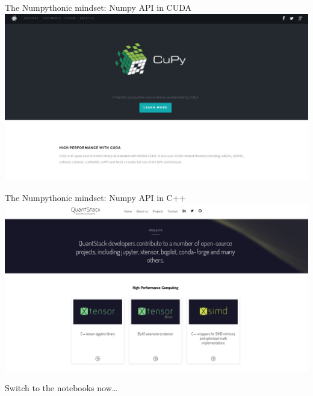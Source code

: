 \documentclass[aspectratio=169]{beamer}
\begin{document}
\begin{frame}{The Numpythonic mindset: Numpy API in CUDA}
\vspace{0.35 cm}
\includegraphics[width=\linewidth]{cupy.png}
\end{frame}

\begin{frame}{The Numpythonic mindset: Numpy API in C++}
\vspace{0.35 cm}
\includegraphics[width=\linewidth]{quantstack.png}
\end{frame}

\begin{frame}{}
\huge
\vspace{0.5 cm}
\begin{center}
Switch to the notebooks now\ldots
\end{center}
\end{frame}
\end{document}

